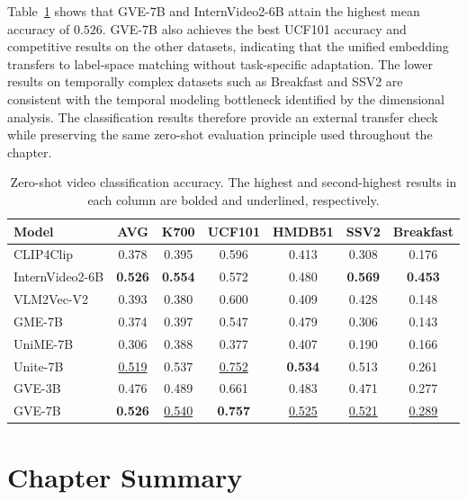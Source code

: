 Table~\ref{gve:tab:video_classification} shows that GVE-7B and InternVideo2-6B attain the highest mean accuracy of $0.526$. GVE-7B also achieves the best UCF101 accuracy and competitive results on the other datasets, indicating that the unified embedding transfers to label-space matching without task-specific adaptation. The lower results on temporally complex datasets such as Breakfast and SSV2 are consistent with the temporal modeling bottleneck identified by the dimensional analysis. The classification results therefore provide an external transfer check while preserving the same zero-shot evaluation principle used throughout the chapter.

\begin{table}[t]
\centering
\caption{Zero-shot video classification accuracy. The highest and second-highest results in each column are bolded and underlined, respectively.}
\label{gve:tab:video_classification}
\begin{tabular}{@{}l|>{\columncolor{gray!15}}c|*{5}{c}@{}}
\toprule
\textbf{Model} & \textbf{AVG} & \textbf{K700} & \textbf{UCF101} & \textbf{HMDB51} & \textbf{SSV2} & \textbf{Breakfast} \\
\midrule
CLIP4Clip       & 0.378 & 0.395 & 0.596 & 0.413 & 0.308 & 0.176 \\
InternVideo2-6B & \textbf{0.526} & \textbf{0.554} & 0.572 & 0.480 & \textbf{0.569} & \textbf{0.453} \\
VLM2Vec-V2      & 0.393 & 0.380 & 0.600 & 0.409 & 0.428 & 0.148 \\
GME-7B          & 0.374 & 0.397 & 0.547 & 0.479 & 0.306 & 0.143 \\
UniME-7B        & 0.306 & 0.388 & 0.377 & 0.407 & 0.190 & 0.166 \\
Unite-7B        & \underline{0.519} & 0.537 & \underline{0.752} & \textbf{0.534} & 0.513 & 0.261 \\
\midrule
GVE-3B          & 0.476 & 0.489 & 0.661 & 0.483 & 0.471 & 0.277 \\
GVE-7B          & \textbf{0.526} & \underline{0.540} & \textbf{0.757} & \underline{0.525} & \underline{0.521} & \underline{0.289} \\
\bottomrule
\end{tabular}
\end{table}

\FloatBarrier
\section{Chapter Summary}

